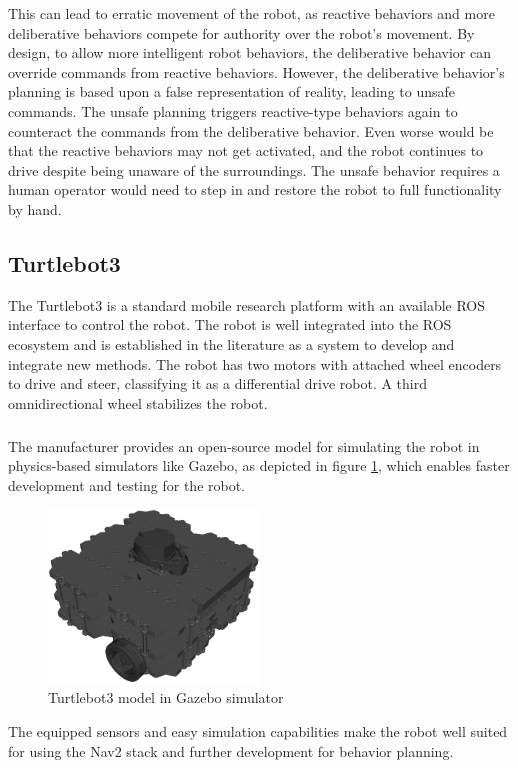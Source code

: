 This can lead to erratic movement of the robot, as reactive behaviors and more deliberative behaviors compete for authority over the robot's movement. By design, to allow more intelligent robot behaviors, the deliberative behavior can override commands from reactive behaviors. However, the deliberative behavior's planning is based upon a false representation of reality, leading to unsafe commands. The unsafe planning triggers reactive-type behaviors again to counteract the commands from the deliberative behavior. Even worse would be that the reactive behaviors may not get activated, and the robot continues to drive despite being unaware of the surroundings. The unsafe behavior requires a human operator would need to step in and restore the robot to full functionality by hand. 



\subsection{Turtlebot3}
The Turtlebot3 is a standard mobile research platform with an available ROS interface to control the robot. The robot is well integrated into the ROS ecosystem and is established in the literature as a system to develop and integrate new methods. 
The robot has two motors with attached wheel encoders to drive and steer, classifying it as a differential drive robot. A third omnidirectional wheel stabilizes the robot. 
\subparagraph*{}
The manufacturer provides an open-source model for simulating the robot in physics-based simulators like Gazebo, as depicted in figure \ref{fig:turtlebot}, which enables faster development and testing for the robot. 
\begin{center}
\begin{figure}[ht]   
	\includegraphics[width=0.5\textwidth]{images/turtlebot_sim.png}
	\caption{Turtlebot3 model in Gazebo simulator}
	\label{fig:turtlebot}
\end{figure}
\end{center}
The equipped sensors and easy simulation capabilities make the robot well suited for using the Nav2 stack and further development for behavior planning. 

